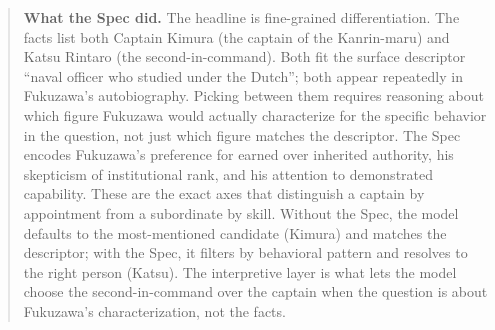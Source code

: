 \begin{quote}
\textbf{What the Spec did.} The headline is fine-grained
differentiation. The facts list both Captain Kimura (the captain of the
Kanrin-maru) and Katsu Rintaro (the second-in-command). Both fit the
surface descriptor ``naval officer who studied under the Dutch''; both
appear repeatedly in Fukuzawa's autobiography. Picking between them
requires reasoning about which figure Fukuzawa would actually
characterize for the specific behavior in the question, not just which
figure matches the descriptor. The Spec encodes Fukuzawa's preference
for earned over inherited authority, his skepticism of institutional
rank, and his attention to demonstrated capability. These are the exact
axes that distinguish a captain by appointment from a subordinate by
skill. Without the Spec, the model defaults to the most-mentioned
candidate (Kimura) and matches the descriptor; with the Spec, it filters
by behavioral pattern and resolves to the right person (Katsu). The
interpretive layer is what lets the model choose the second-in-command
over the captain when the question is about Fukuzawa's characterization,
not the facts.
\end{quote}

